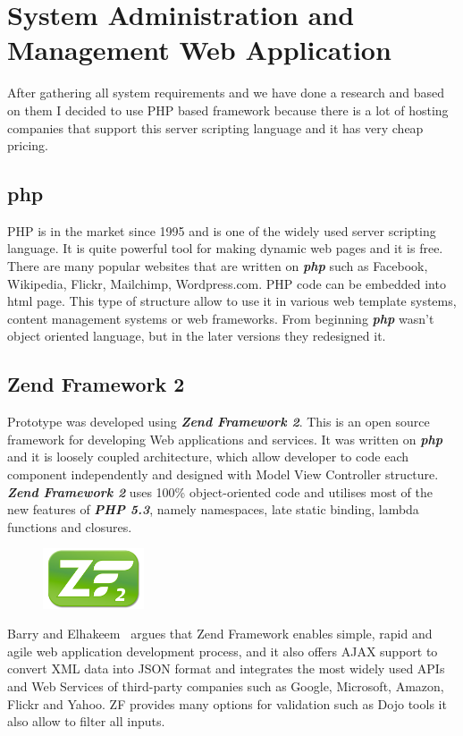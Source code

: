   \section{System Administration and Management Web Application}	%
  After gathering all system requirements and we have done a research and based on them I decided to use PHP based framework because there is a lot of hosting companies that support this server scripting language and it has very cheap pricing.
  

    \subsection{php}
	PHP is in the market since 1995 and is one of the widely used server scripting language. It is quite powerful tool for making dynamic web pages and it is free. There are many popular websites that are written on \textbf{\textit{php}} such as Facebook, Wikipedia, Flickr, Mailchimp, Wordpress.com. PHP code can be embedded into html page. This type of structure allow to use it in various web template systems, content management systems or web frameworks. From beginning \textbf{\textit{php}} wasn't object oriented language, but in the later versions they redesigned it.

    \subsection{Zend Framework 2}
		Prototype was developed using \textbf{\textit{Zend Framework 2}}. This is an open source framework for developing Web applications and services. It was written on \textbf{\textit{php}} and it is loosely coupled architecture, which allow developer to code each component independently and designed with Model View Controller structure. \textbf{\textit{Zend Framework 2}} uses 100\% object-oriented code and utilises most of the new features of \textbf{\textit{PHP 5.3}}, namely namespaces, late static binding, lambda functions and closures.~\cite{ZendFramework-Website-About}
		
		\begin{figure}
			\includegraphics[width=3cm]{img/zf2/zf2-logo.png}
		\end{figure} 
		Barry and Elhakeem~\cite{ZendFramework-Security-Model} argues that Zend Framework enables simple, rapid and agile web application development process, and it also offers AJAX support to convert XML data into JSON format and integrates the most widely used APIs and Web Services of third-party companies such as Google, Microsoft, Amazon, Flickr and Yahoo. ZF provides many options for validation such as Dojo tools it also allow to filter all inputs.
		
